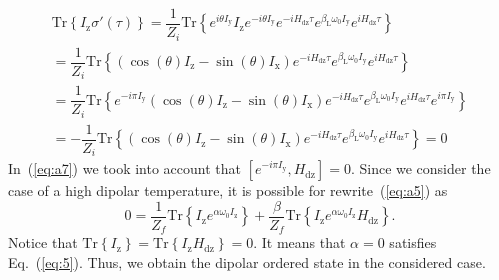 \documentclass[review]{elsarticle}
\newcommand{\tr}[1]{\mathrm{Tr} \left\{ #1 \right\}}
\newcommand{\sx}{I_\mathrm{x}}
\newcommand{\sy}{I_\mathrm{y}}
\newcommand{\sz}{I_\mathrm{z}}
\newcommand{\hdz}{H_\mathrm{dz}}
\begin{document}
\begin{multline}
    \label{eq:a7} 
    \tr{I_\mathrm{z} \sigma'(\tau)}
    =  \dfrac{1}{Z_{i}} \tr{
        e^{i \theta \sy} \sz e^{-i \theta \sy}
        e^{-i \hdz \tau} e^{\beta_\mathrm{L} \omega_{0} \sy} e^{i \hdz \tau}
    } 
    \\
    = \dfrac{1}{Z_i} \tr{
        \left( \cos(\theta) \sz - \sin(\theta) \sx \right) 
        e^{-i \hdz \tau} e^{\beta_\mathrm{L} \omega_{0} \sy} e^{i \hdz \tau}
    }
    \\
    = \dfrac{1}{Z_i} \tr{
        e^{-i \pi \sy}  
        \left( \cos(\theta) \sz - \sin(\theta) \sx \right) 
        e^{-i \hdz \tau} e^{\beta_\mathrm{L} \omega_{0} \sy} e^{i \hdz \tau}
        e^{i \pi \sy}  
    }
    \\
    = - \dfrac{1}{Z_i} \tr{
        \left( \cos(\theta) \sz - \sin(\theta) \sx \right) 
        e^{-i \hdz \tau} e^{\beta_\mathrm{L} \omega_{0} \sy} e^{i \hdz \tau} 
    } = 0
\end{multline}
%
In~(\ref{eq:a7}) we took into account that $\left[ e^{-i \pi \sy}, \hdz \right] = 0$.
Since we consider the case of a high dipolar temperature, it is possible for rewrite~(\ref{eq:a5}) as
\begin{equation}
    \label{eq:a8}
    0 = \dfrac{1}{Z_f} \tr{ \sz e^{\alpha \omega_0 \sz}}
    + \dfrac{\beta}{Z_f} \tr{\sz e^{\alpha \omega_0 \sz} \hdz}.
\end{equation}
%
Notice that $\tr{\sz} = \tr{\sz\hdz} = 0$. It means that $\alpha = 0$ satisfies Eq.~(\ref{eq:5}). 
Thus, we obtain the dipolar ordered state in the considered case.


\end{document}
